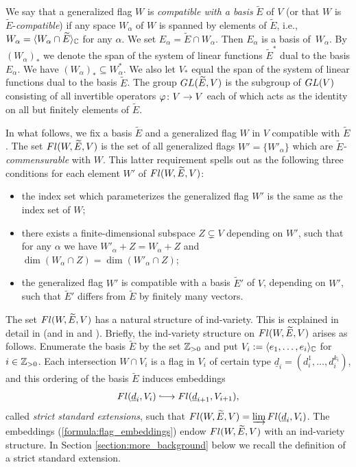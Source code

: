 \documentclass[11pt, a4paper]{article}
\begin{document}
We say that a generalized flag $W$ is \emph{compatible with a basis} $\widetilde{E}$ of $V$ (or that $W$ is $\widetilde{E}$-\emph{compatible}) if any space $W_{\alpha}$ of $W$ is spanned by elements of $\widetilde{E}$, i.e., $W_{\alpha}=\langle W_{\alpha}\cap \widetilde{E} \rangle_{\mathbb{C}}$ for any $\alpha$. We set $E_{\alpha}=\widetilde{E}\cap W_{\alpha}$. Then $E_\alpha$ is a basis of~$W_{\alpha}$. By $(W_{\alpha})_*$ we denote the span of the system of linear functions $\widetilde{E}^*$ dual to the basis $E_{\alpha}$. We have $(W_{\alpha})_*\subseteq W^*_{\alpha}$. We also let $V_*$ equal the span of the system of linear functions dual to the basis $\widetilde{E}$. The group $GL(\widetilde{E},V)$ is the subgroup of $GL(V)$ consisting of all invertible operators $\varphi\colon V\rightarrow V$ each of which acts as the identity on all but finitely elements of $\widetilde{E}$.

In what follows, we fix a basis $\widetilde{E}$ and a generalized flag $W$ in $V$ compatible with $\widetilde{E}$. The set $Fl(W,\widetilde{E},V)$ is the set of all generalized flags $W'=\{W'_{\alpha}\}$ which are $\widetilde{E}$\emph{-commensurable} with $W$. This latter requirement spells out as the following three conditions for each element $W'$ of $Fl(W,\widetilde{E},V)$:

\begin{itemize}
	\item the index set which parameterizes the generalized flag $W'$ is the same as the index set of $W$;
	\item there exists a finite-dimensional subspace $Z\subsetneq V$ depending on $W'$, such that for any $\alpha$ we have $W'_{\alpha}+Z= W_{\alpha}+Z$ and $\dim(W_{\alpha}\cap Z)=\dim(W'_{\alpha}\cap Z)$;
	\item the generalized flag $W'$ is compatible with a basis $\widetilde{E}'$ of $V$, depending on $W'$, such that $\widetilde{E}'$ differs from $\widetilde{E}$ by finitely many vectors.
\end{itemize}

The set $Fl(W,\widetilde{E},V)$ has a natural structure of ind-variety. This is explained in detail in \cite{DimitrovPenkov} (and in \cite{IgnatyevPenkov} and \cite{PenkovTikhomirov2}). Briefly, the ind-variety structure on $Fl(W,\widetilde{E},V)$ arises as follows. Enumerate the basis $\widetilde{E}$ by the set $\mathbb{Z}_{>0}$ and put $V_{i}:=\langle e_1,\ldots,e_i \rangle_{\mathbb{C}}$ for $i\in\mathbb{Z}_{>0}$. Each intersection $W\cap V_i$ is a flag in $V_i$ of certain type $\underline{d}_i=(d_i^1,\ldots,d_i^{k_i})$, and this ordering of the basis $\widetilde{E}$ induces embeddings \begin{equation}\label{formula:flag_embeddings}
	\Fl(\underline{d}_i,V_i)\hooklongrightarrow \Fl(\underline{d}_{i+1},V_{i+1}),
\end{equation}
called \emph{strict standard extensions},
such that $Fl(W,\widetilde{E},V)=\varinjlim Fl(\underline{d}_i,V_i)$. The embeddings (\ref{formula:flag_embeddings}) endow $Fl(W,\widetilde{E},V)$ with an ind-variety structure. In Section \ref{section:more_background} below we recall the definition of a strict standard extension.
\end{document}
